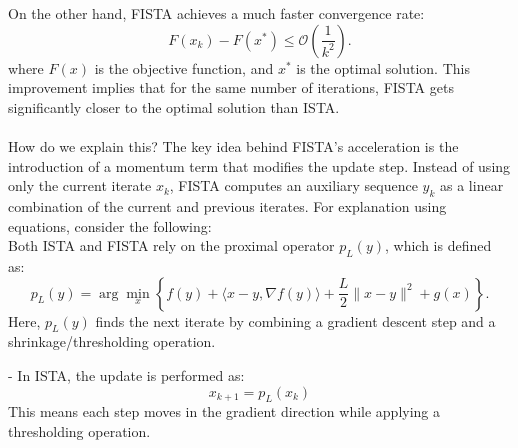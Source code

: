 \documentclass{article}
\begin{document}
\begin{enumerate}
\begin{enumerate}
On the other hand, FISTA achieves a much faster convergence rate:
\begin{equation}
    F(x_k) - F(x^*) \leq \mathcal{O}\left(\frac{1}{k^2}\right).
\end{equation}
where \( F(x) \) is the objective function, and \( x^* \) is the optimal solution.
This improvement implies that for the same number of iterations, FISTA gets significantly closer to the optimal solution than ISTA.
\\\\
How do we explain this? The key idea behind FISTA's acceleration is the introduction of a momentum term that modifies the update step. Instead of using only the current iterate \( x_k \), FISTA computes an auxiliary sequence \( y_k \) as a linear combination of the current and previous iterates. For explanation using equations, consider the following: \\Both ISTA and FISTA rely on the proximal operator \( p_L(y) \), which is defined as:
\begin{equation}
    p_L(y) = \arg\min_x \left\{ f(y) + \langle x - y, \nabla f(y) \rangle + \frac{L}{2} \|x - y\|^2 + g(x) \right\}.
\end{equation}
Here, \( p_L(y) \) finds the next iterate by combining a gradient descent step and a shrinkage/thresholding operation.

- In ISTA, the update is performed as:
  \begin{equation}
      x_{k+1} = p_L(x_k)
  \end{equation}
  This means each step moves in the gradient direction while applying a thresholding operation.


\end{enumerate}
\end{enumerate}
\end{document}
